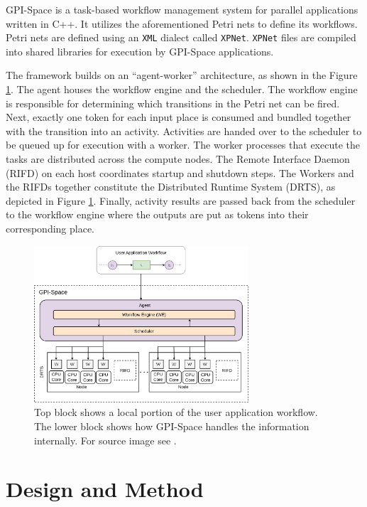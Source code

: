 \documentclass{juliacon}
\begin{document}
GPI-Space is a task-based workflow management system for parallel applications written in C++.
It utilizes the aforementioned Petri nets to define its workflows.
Petri nets are defined using an \verb+XML+ dialect called \verb+XPNet+.
\verb+XPNet+ files are compiled into shared libraries for execution by GPI-Space applications.\vskip 6pt

The framework builds on an “agent-worker” architecture, as shown in the Figure \ref{GPISpace_arch}.
The agent houses the workflow engine and the scheduler.
The workflow engine is responsible for determining which transitions in the Petri net can be fired.
Next, exactly one token for each input place is consumed and bundled together with the transition into an activity.
Activities are handed over to the scheduler to be queued up for execution with a worker.
The worker processes that execute the tasks are distributed across the compute nodes. 
The Remote Interface Daemon (RIFD) on each host coordinates startup and shutdown steps.
The Workers and the RIFDs together constitute the Distributed Runtime System (DRTS), as depicted in Figure \ref{GPISpace_arch}.
Finally, activity results are passed back from the scheduler to the workflow engine where the outputs are put as tokens into their corresponding place.

\begin{figure}[h]
    \centerline{\includegraphics[width=8cm]{GPISpace_arch.png}}
    \caption{Top block shows a local portion of the user application workflow. The lower block shows how GPI-Space handles the information internally. For source image see \cite{GSPC}.}
    \label{GPISpace_arch}
\end{figure}


\section{Design and Method}
\label{sec:design_and_method}
\end{document}
